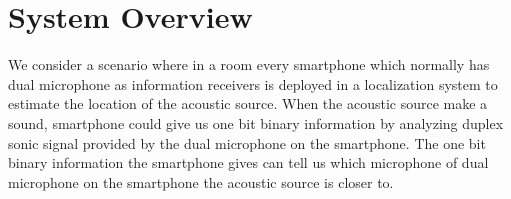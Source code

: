 \section{System Overview}
We consider a scenario where in a room every smartphone which normally has dual microphone as information receivers%
is deployed in a localization system to estimate the location of the acoustic source. When the acoustic source make a sound, smartphone could give us one bit binary information by analyzing duplex sonic signal provided by the dual microphone on the smartphone. The one bit binary information the smartphone gives can tell us which microphone of dual microphone on the smartphone the acoustic source is closer to. 